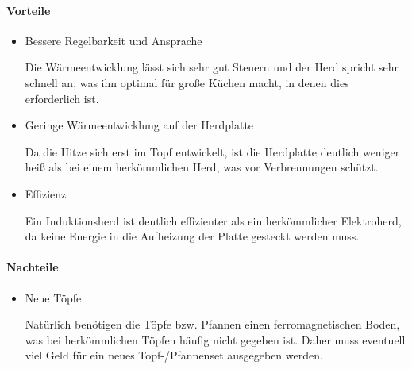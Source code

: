 \paragraph{Vorteile}

\begin{itemize}
	\item Bessere Regelbarkeit und Ansprache
	
Die Wärmeentwicklung lässt sich sehr gut Steuern und der Herd spricht sehr schnell an, was ihn optimal für große Küchen macht, in denen dies erforderlich ist.

	\item Geringe Wärmeentwicklung auf der Herdplatte
	
Da die Hitze sich erst im Topf entwickelt, ist die Herdplatte deutlich weniger heiß als bei einem herkömmlichen Herd, was vor Verbrennungen schützt.

	\item Effizienz
	
Ein Induktionsherd ist deutlich effizienter als ein herkömmlicher Elektroherd, da keine Energie in die Aufheizung der Platte gesteckt werden muss.
\end{itemize}



\paragraph{Nachteile}

\begin{itemize}

	\item Neue Töpfe

Natürlich benötigen die Töpfe bzw. Pfannen einen ferromagnetischen Boden, was bei herkömmlichen Töpfen häufig nicht gegeben ist. Daher muss eventuell viel Geld für ein neues Topf-/Pfannenset ausgegeben werden.
\end{itemize}


